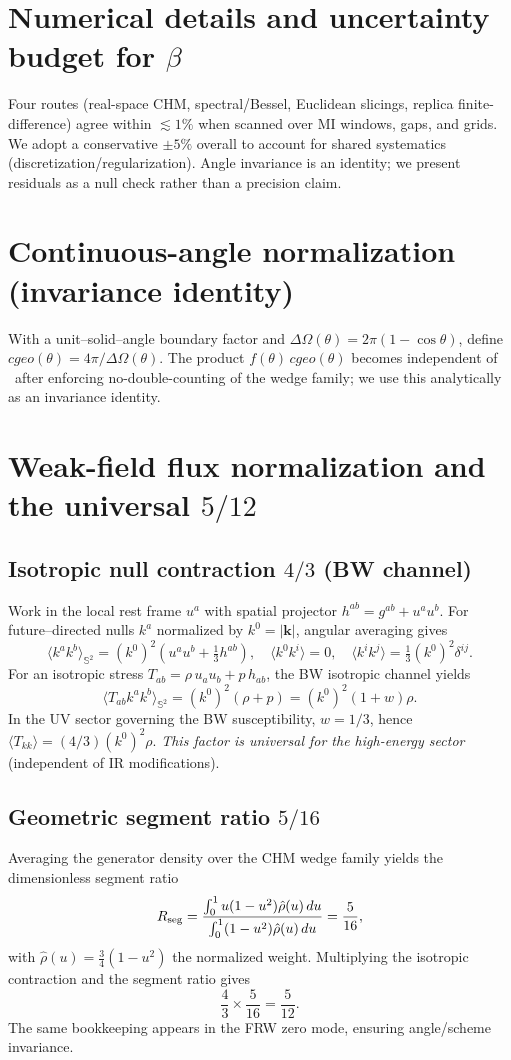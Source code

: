 \documentclass[aps,prd,onecolumn,superscriptaddress,nofootinbib]{revtex4-2}
\def\cgeo{cgeo}%
\def\Omega_\Lambda{OmegaLambda}%
\providecommand{\cgeo}{c_{\rm geo}}
\begin{document}
\section{Numerical details and uncertainty budget for \texorpdfstring{$\beta$}{beta}}
\label{app:beta}
Four routes (real-space CHM, spectral/Bessel, Euclidean slicings, replica finite-difference) agree within \(\lesssim 1\%\) when scanned over MI windows, gaps, and grids. We adopt a conservative \(\pm 5\%\) overall to account for shared systematics (discretization/regularization). Angle invariance is an identity; we present residuals as a null check rather than a precision claim.

\section{Continuous-angle normalization (invariance identity)}
\label{app:angle}
With a unit--solid--angle boundary factor and \(\Delta\Omega(\theta)=2\pi(1-\cos\theta)\), define \(\cgeo(\theta)=4\pi/\Delta\Omega(\theta)\). The product \(f(\theta)\,\cgeo(\theta)\) becomes independent of \theta\ after enforcing no-double-counting of the wedge family; we use this analytically as an invariance identity.

\section{Weak-field flux normalization and the universal \texorpdfstring{$5/12$}{5/12}}
\label{app:five-twelve}
\subsection*{Isotropic null contraction \(4/3\) (BW channel)}
Work in the local rest frame \(u^a\) with spatial projector \(h^{ab}=g^{ab}+u^a u^b\). For future--directed nulls \(k^a\) normalized by \(k^0=|\mathbf{k}|\), angular averaging gives
\[
\big\langle k^a k^b\big\rangle_{\mathbb{S}^2}=(k^0)^2\!\left(u^a u^b+\tfrac{1}{3}h^{ab}\right),\quad
\langle k^0 k^i\rangle=0,\quad \langle k^i k^j\rangle=\tfrac{1}{3}(k^0)^2\delta^{ij}.
\]
For an isotropic stress \(T_{ab}=\rho\,u_a u_b + p\,h_{ab}\), the BW isotropic channel yields
\[
\big\langle T_{ab}k^a k^b\big\rangle_{\mathbb{S}^2}=(k^0)^2(\rho+p)=(k^0)^2(1+w)\rho.
\]
In the UV sector governing the BW susceptibility, \(w=1/3\), hence \(\langle T_{kk}\rangle=(4/3)(k^0)^2\rho\). \textit{This factor is universal for the high-energy sector} (independent of IR modifications).

\subsection*{Geometric segment ratio \(5/16\)}
Averaging the generator density over the CHM wedge family yields the dimensionless segment ratio
\[
R_{\rm seg}=\frac{\int_0^1 u(1-u^2)\hat\rho(u)\,du}{\int_0^1 (1-u^2)\hat\rho(u)\,du}=\frac{5}{16},
\]
with \(\hat\rho(u)=\tfrac{3}{4}(1-u^2)\) the normalized weight. Multiplying the isotropic contraction and the segment ratio gives
\[
\frac{4}{3}\times \frac{5}{16}=\frac{5}{12}.
\]
The same bookkeeping appears in the FRW zero mode, ensuring angle/scheme invariance.
\end{document}

